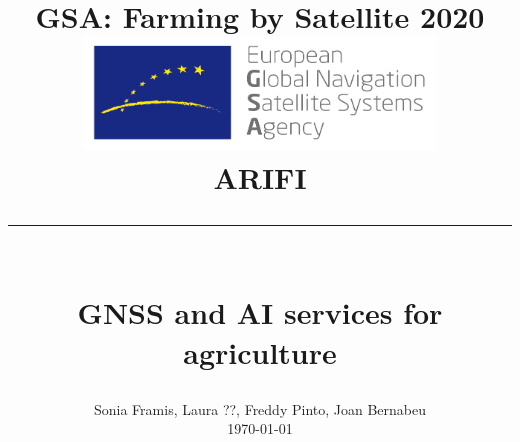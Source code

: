 \documentclass[12pt]{article}
\begin{document}
	
\title{%
	\vspace{-3cm}
	\Large
	\textbf{GSA: Farming by Satellite 2020}\\
		\vspace{1cm}
		\includegraphics[width=0.7\textwidth]{images/logo.png}\\
	\vspace{3cm}
	\huge
	\textbf{ARIFI}
	\rule[0.7cm]{\textwidth}{0.4pt}\\
	\huge
	\vspace{-0.7cm}
	GNSS and AI services for agriculture\\
}

\date{%
	\vspace{7cm}
	Sonia Framis, Laura ??, Freddy Pinto, Joan Bernabeu\\
	\vspace{0.5cm}
	\today}
\maketitle
{}




\end{document}
